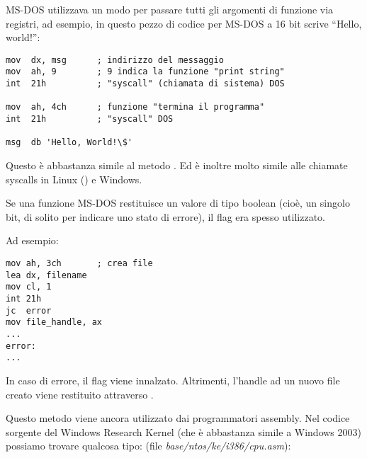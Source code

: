 
MS-DOS utilizzava un modo per passare tutti gli argomenti di funzione via registri, ad esempio, in questo pezzo
di codice per MS-DOS a 16 bit scrive ``Hello, world!'':

\begin{lstlisting}[style=customasmx86]
mov  dx, msg      ; indirizzo del messaggio
mov  ah, 9        ; 9 indica la funzione "print string"
int  21h          ; "syscall" (chiamata di sistema) DOS

mov  ah, 4ch      ; funzione "termina il programma"
int  21h          ; "syscall" DOS

msg  db 'Hello, World!\$'
\end{lstlisting}

Questo è abbastanza simile al metodo .
Ed è inoltre molto simile alle chiamate syscalls in Linux () e Windows.

Se una funzione MS-DOS restituisce un valore di tipo boolean (cioè, un singolo bit, di solito per indicare uno stato di errore),
il flag  era spesso utilizzato.

Ad esempio:

\begin{lstlisting}[style=customasmx86]
mov ah, 3ch       ; crea file
lea dx, filename
mov cl, 1
int 21h
jc  error
mov file_handle, ax
...
error:
...
\end{lstlisting}

In caso di errore, il flag  viene innalzato. Altrimenti, l'handle ad un nuovo file creato viene restituito attraverso .

Questo metodo viene ancora utilizzato dai programmatori assembly.
Nel codice sorgente del Windows Research Kernel (che è abbastanza simile a Windows 2003) possiamo trovare qualcosa tipo:
(file \emph{base/ntos/ke/i386/cpu.asm}):

